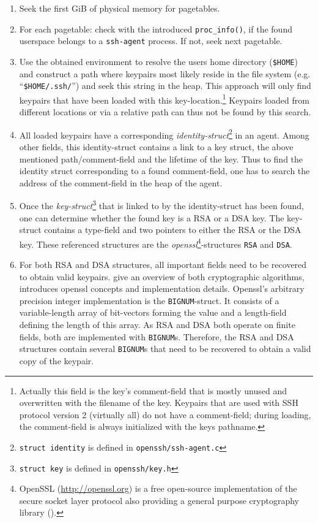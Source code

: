 \begin{enumerate}

	\item Seek the first GiB of physical memory for pagetables.

	\item For each pagetable: check with the introduced
	\texttt{proc\_info()}, if the found userspace belongs to a
	\texttt{ssh-agent} process. If not, seek next pagetable.

	\item Use the obtained environment to resolve the users home directory
	(\texttt{\$HOME}) and construct a path where keypairs most likely reside
	in the file system (e.g.  ``\texttt{\$HOME/.ssh/}'') and seek this
	string in the heap.  This approach will only find keypairs that have
	been loaded with this key-location.\footnote{Actually this field is the
	key's comment-field that is mostly unused and overwritten with the
	filename of the key. Keypairs that are used with SSH protocol version 2
	(virtually all) do not have a comment-field; during loading, the
	comment-field is always initialized with the keys pathname.} Keypairs
	loaded from different locations or via a relative path can thus not be
	found by this search.
	
	\item All loaded keypairs have a corresponding
	\emph{identity-struct}\footnote{\texttt{struct identity} is defined in
	\texttt{openssh/ssh-agent.c}} in an agent. Among other fields, this
	identity-struct contains a link to a key struct, the above mentioned
	path/comment-field and the lifetime of the key. Thus to find the
	identity struct corresponding to a found comment-field, one has to
	search the address of the comment-field in the heap of the agent.
	
	\item Once the \emph{key-struct}\footnote{\texttt{struct key} is defined
	in \texttt{openssh/key.h}} that is linked to by the identity-struct has
	been found, one can determine whether the found key is a RSA or a DSA
	key.  The key-struct contains a type-field and two pointers to either
	the RSA or the DSA key. These referenced structures are the
	\emph{openssl}\footnote{OpenSSL
	(\href{http://openssl.org}{http://openssl.org}) is a free open-source
	implementation of the secure socket layer protocol also providing a
	general purpose cryptography library ().}-structures
	\texttt{RSA} and \texttt{DSA}.
	
	\item For both RSA and DSA structures, all important fields need to be
	recovered to obtain valid keypairs. \cite{applied_crypto:1996,
	handbook_applied_crypto:2001} give an overview of both cryptographic
	algorithms, \cite{openssl_book:2002} introduces openssl concepts and
	implementation details. Openssl's arbitrary precision integer
	implementation is the \texttt{BIGNUM}-struct. It consists of a
	variable-length array of bit-vectors forming the value and a
	length-field defining the length of this array. As RSA and DSA both
	operate on finite fields, both are implemented with \texttt{BIGNUM}s.
	Therefore, the RSA and DSA structures contain several \texttt{BIGNUM}s
	that need to be recovered to obtain a valid copy of the keypair.


\end{enumerate}
